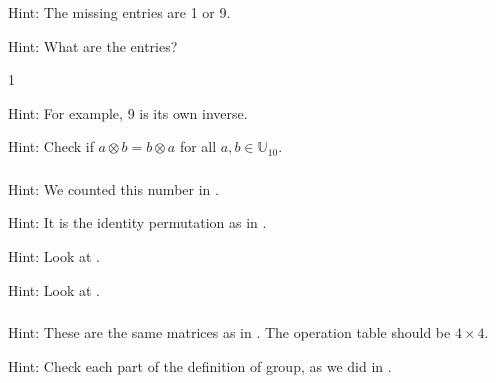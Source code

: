 \subsubsection*{ \answers}
\begin{apart}
    \item Hint: The missing entries are 1 or 9.
    \item Hint: What are the entries?
    \item 1
    \item Hint: For example, 9 is its own inverse.
    \item Hint: Check if $a \otimes b = b \otimes a$ for all $a, b \in \mathbb{U}_{10}$.
\end{apart}

\subsubsection*{ \answers}
\begin{apart}
    \item Hint: We counted this number in .
    \item Hint: It is the identity permutation as in .
    \item Hint: Look at .
    \item Hint: Look at .
\end{apart}

\subsubsection*{ \answers}
\begin{apart}
    \item Hint: These are the same matrices as in . The operation table should be $4 \times 4$.
    \item Hint: Check each part of the definition of group, as we did in .
\end{apart}


